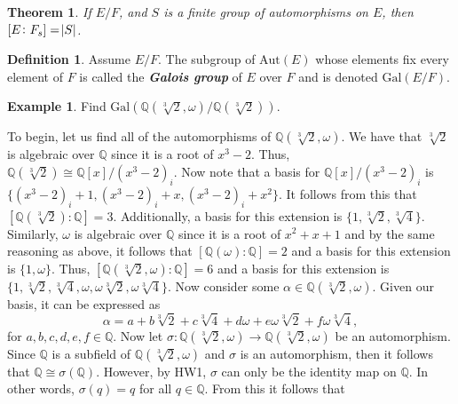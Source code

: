\documentclass{article}
\makeatletter
\newtheorem{theorem}{Theorem}
\theoremstyle{definition}
\newtheorem{definition}{Definition}
\theoremstyle{remark}
\theoremstyle{definition}
\newtheorem{example}{Example}
\newenvironment{solution}[1][\bf{\textit{Solution}}]{\par
  
  \normalfont \topsep6\p@\@plus6\p@\relax
  \list{}{\leftmargin=0mm
          \rightmargin=0mm
          \settowidth{\itemindent}{\itshape#1}%
          \labelwidth=\itemindent
          \parsep=0pt \listparindent=\parindent 
  }
  \item[\hskip\labelsep
        \itshape
    #1\@addpunct{.}]\ignorespaces
}{%
  \popQED\endlist\@endpefalse
}
\makeatother
\begin{document}
    \begin{theorem}
        If $E/F$, and $S$ is a finite group of automorphisms on $E$, then $[E\colon F_s]=\abs{S}$.
    \end{theorem}
    \begin{definition}
        Assume $E/F$. The subgroup of $\text{Aut}(E)$ whose elements fix every element of $F$ is called the \textbf{\textit{Galois group}} of $E$ over $F$ and is denoted $\text{Gal}(E/F)$.
    \end{definition}
    \begin{example}
        Find $\text{Gal}(\mathbb{Q}(\sqrt[3]{2},\omega)/\mathbb{Q}(\sqrt[3]{2}))$.
    \end{example}
        \begin{solution}
            To begin, let us find all of the automorphisms of $\mathbb{Q}(\sqrt[3]{2},\omega)$. We have that $\sqrt[3]{2}$ is algebraic over $\mathbb{Q}$ since it is a root of $x^3-2$. Thus, $\mathbb{Q}(\sqrt[3]{2})\cong\mathbb{Q}[x]/(x^3-2)_i$. Now note that a basis for $\mathbb{Q}[x]/(x^3-2)_i$ is $\{(x^3-2)_i+1,(x^3-2)_i+x,(x^3-2)_i+x^2\}$. It follows from this that $[\mathbb{Q}(\sqrt[3]{2})\colon\mathbb{Q}]=3$. Additionally, a basis for this extension is $\{1,\sqrt[3]{2},\sqrt[3]{4}\}$. Similarly, $\omega$ is algebraic over $\mathbb{Q}$ since it is a root of $x^2+x+1$ and by the same reasoning as above, it follows that $[\mathbb{Q}(\omega)\colon\mathbb{Q}]=2$ and a basis for this extension is $\{1,\omega\}$. Thus, $[\mathbb{Q}(\sqrt[3]{2},\omega)\colon\mathbb{Q}]=6$ and a basis for this extension is $\{1,\sqrt[3]{2},\sqrt[3]{4},\omega,\omega\sqrt[3]{2},\omega\sqrt[3]{4}\}$. Now consider some $\alpha\in\mathbb{Q}(\sqrt[3]{2},\omega)$. Given our basis, it can be expressed as 
                    \begin{equation*}
                        \alpha=a+b\sqrt[3]{2}+c\sqrt[3]{4}+d\omega+e\omega\sqrt[3]{2}+f\omega\sqrt[3]{4},
                    \end{equation*}
                for $a,b,c,d,e,f\in\mathbb{Q}$. Now let $\sigma\colon\mathbb{Q}(\sqrt[3]{2},\omega)\rightarrow\mathbb{Q}(\sqrt[3]{2},\omega)$ be an automorphism. Since $\mathbb{Q}$ is a subfield of $\mathbb{Q}(\sqrt[3]{2},\omega)$ and $\sigma$ is an automorphism, then it follows that $\mathbb{Q}\cong\sigma(\mathbb{Q})$. However, by HW1, $\sigma$ can only be the identity map on $\mathbb{Q}$. In other words, $\sigma(q)=q$ for all $q\in\mathbb{Q}$. From this it follows that 
                    \begin{equation*}

\end{equation*}
\end{solution}
\end{document}

